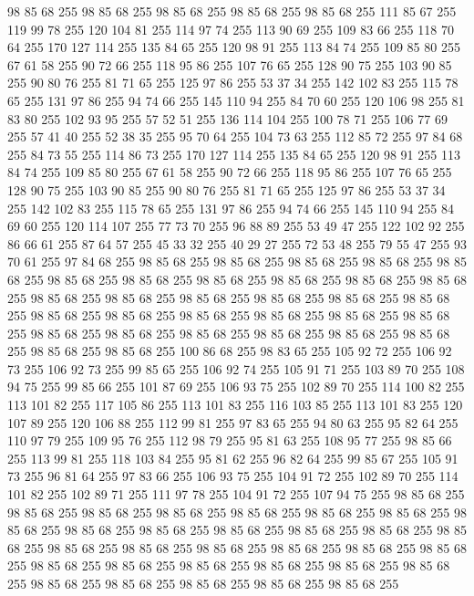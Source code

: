 98 85 68 255 98 85 68 255 98 85 68 255 98 85 68 255 98 85 68 255 111 85 67 255 119 99 78 255 120 104 81 255 114 97 74 255 113 90 69 255 109 83 66 255 118 70 64 255 170 127 114 255 135 84 65 255 120 98 91 255 113 84 74 255 109 85 80 255 67 61 58 255 90 72 66 255 118 95 86 255 107 76 65 255 128 90 75 255 103 90 85 255 90 80 76 255 81 71 65 255 125 97 86 255 53 37 34 255 142 102 83 255 115 78 65 255 131 97 86 255 94 74 66 255 145 110 94 255 84 70 60 255 120 106 98 255 81 83 80 255 102 93 95 255 57 52 51 255 136 114 104 255 100 78 71 255 106 77 69 255 57 41 40 255 52 38 35 255 95 70 64 255 104 73 63 255 112 85 72 255 97 84 68 255 84 73 55 255 114 86 73 255 170 127 114 255 135 84 65 255 120 98 91 255 113 84 74 255 109 85 80 255 67 61 58 255 90 72 66 255 118 95 86 255 107 76 65 255 128 90 75 255 103 90 85 255 90 80 76 255 81 71 65 255 125 97 86 255 53 37 34 255 142 102 83 255
115 78 65 255 131 97 86 255 94 74 66 255 145 110 94 255 84 69 60 255 120 114 107 255 77 73 70 255 96 88 89 255 53 49 47 255 122 102 92 255 86 66 61 255 87 64 57 255 45 33 32 255 40 29 27 255 72 53 48 255 79 55 47 255 93 70 61 255 97 84 68 255 98 85 68 255 98 85 68 255 98 85 68 255 98 85 68 255 98 85 68 255 98 85 68 255 98 85 68 255 98 85 68 255 98 85 68 255 98 85 68 255 98 85 68 255 98 85 68 255 98 85 68 255 98 85 68 255 98 85 68 255 98 85 68 255 98 85 68 255 98 85 68 255 98 85 68 255 98 85 68 255 98 85 68 255 98 85 68 255 98 85 68 255 98 85 68 255 98 85 68 255 98 85 68 255 98 85 68 255 98 85 68 255 98 85 68 255 98 85 68 255 98 85 68 255 100 86 68 255 98 83 65 255 105 92 72 255 106 92 73 255 106 92 73 255 99 85 65 255 106 92 74 255 105 91 71 255 103 89 70 255 108 94 75 255 99 85 66 255 101 87 69 255 106 93 75 255 102 89 70 255 114 100 82 255
113 101 82 255 117 105 86 255 113 101 83 255 116 103 85 255 113 101 83 255 120 107 89 255 120 106 88 255 112 99 81 255 97 83 65 255 94 80 63 255 95 82 64 255 110 97 79 255 109 95 76 255 112 98 79 255 95 81 63 255 108 95 77 255 98 85 66 255 113 99 81 255 118 103 84 255 95 81 62 255 96 82 64 255 99 85 67 255 105 91 73 255 96 81 64 255 97 83 66 255 106 93 75 255 104 91 72 255 102 89 70 255 114 101 82 255 102 89 71 255 111 97 78 255 104 91 72 255 107 94 75 255 98 85 68 255 98 85 68 255 98 85 68 255 98 85 68 255 98 85 68 255 98 85 68 255 98 85 68 255 98 85 68 255 98 85 68 255 98 85 68 255 98 85 68 255 98 85 68 255 98 85 68 255 98 85 68 255 98 85 68 255 98 85 68 255 98 85 68 255 98 85 68 255 98 85 68 255 98 85 68 255 98 85 68 255 98 85 68 255 98 85 68 255 98 85 68 255 98 85 68 255 98 85 68 255 98 85 68 255 98 85 68 255 98 85 68 255 98 85 68 255 98 85 68 255
